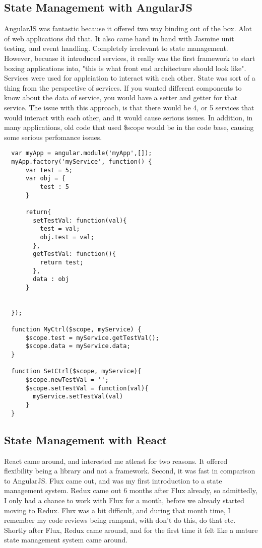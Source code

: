 \subsection{ State Management with AngularJS }
AngularJS was fantastic because it offered two way binding out of the box. Alot
of web applications did that. It also came hand in hand with Jasmine unit testing,
and event handling. Completely irrelevant to state management. However, becuase
it introduced services, it really was the first framework to start boxing
applications into, "this is what front end architecture should look like".
Services were used for applciation to interact with each other. State was sort
of a thing from the perspective of services. If you wanted different components
to know about the data of service, you would have a setter and getter for that
service. The issue with this approach, is that there would be 4, or 5 services
that would interact with each other, and it would cause serious issues. In
addition, in many applications, old code that used \$scope would be in the code
base, causing some serious perfomance issues.
\begin{lstlisting}
  var myApp = angular.module('myApp',[]);
  myApp.factory('myService', function() {
      var test = 5;
      var obj = {
          test : 5
      }

      return{
        setTestVal: function(val){
          test = val;
          obj.test = val;
        },
        getTestVal: function(){
          return test;
        },
        data : obj
      }


  });

  function MyCtrl($scope, myService) {
      $scope.test = myService.getTestVal();
      $scope.data = myService.data;
  }

  function SetCtrl($scope, myService){
      $scope.newTestVal = '';
      $scope.setTestVal = function(val){
        myService.setTestVal(val)
      }
  }
\end{lstlisting}


\subsection{ State Management with React }
React came around, and interested me atleast for two reasons. It offered
flexibility being a library and not a framework. Second, it was fast in
comparison to AngularJS. Flux came out, and was my first introduction to a
state management system. Redux came out 6 months after Flux already, so
admittedly, I only had a chance to work with Flux for a month, before we already
started moving to Redux. Flux was a bit difficult, and during that month time,
I remember my code reviews being rampant, with don't do this, do that etc.
Shortly after Flux, Redux came around, and for the first time it felt like a
mature state management system came around.

